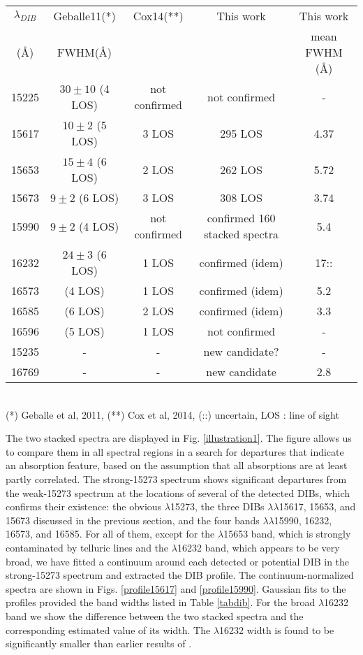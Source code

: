 \documentclass[printer]{aa} %
\begin{document}
\begin{table*}
\caption{DIB detections in the APOGEE spectral range (except
for the strong $\lambda$15273 DIB) and their widths.}             
\label{tabdib}      
\centering                         
\begin{tabular}{c c c c c}        
\hline
\hline                 
$\lambda_{DIB}$ & Geballe11(*)  &  Cox14(**)  &  This work & This work  \\    
(\AA)  & FWHM(\AA) & &  & mean FWHM (\AA) \\    
\hline                      
15225 & $ 30 \pm 10$ (4 LOS)  & not confirmed &  not confirmed & - \\
15617 & $10 \pm 2$ (5 LOS) & 3 LOS  &  295 LOS & 4.37 \\
15653 &  $ 15 \pm 4$ (6 LOS) & 2 LOS &  262 LOS & 5.72 \\
15673 & $ 9 \pm 2 $ (6 LOS) & 3 LOS  &  308 LOS &  3.74 \\
15990 & $ 9 \pm 2$ (4 LOS) & not confirmed &  confirmed 160 stacked spectra & 5.4 \\
16232 & $ 24 \pm 3 $ (6 LOS) & 1 LOS &   confirmed (idem) & 17:: \\
16573 & (4 LOS) &  1 LOS  & confirmed (idem)& 5.2\\
16585 & (6 LOS) &   2 LOS &confirmed (idem)& 3.3 \\
16596 & (5 LOS) & 1 LOS &  not confirmed  & - \\
\hline
\hline                                
15235 & - & - & new candidate? & - \\
16769 & - & - & new candidate& 2.8\\
\hline                                
\end{tabular}
\\ 
(*) Geballe et al, 2011, (**) Cox et al, 2014, (::) uncertain, LOS : line of sight
\end{table*}
The two stacked spectra are displayed in Fig. \ref{illustration1}. The figure allows us to compare them in all spectral regions in a search for departures that indicate an absorption feature, based on the assumption that all absorptions are at least partly correlated. 
The strong-15273 spectrum shows significant departures from the weak-15273 spectrum at the locations of several of the detected DIBs, which confirms their existence: the obvious $\lambda$15273, the three DIBs  $\lambda\lambda$15617, 15653, and 15673  discussed in the previous section, and the four  bands
$\lambda\lambda$15990, 16232, 16573,  and 16585. For all of them, except for the $\lambda$15653  band, which is strongly contaminated by telluric lines and the $\lambda$16232 band, which  appears to be very broad, we have fitted a continuum around each detected or potential DIB in the strong-15273 spectrum and extracted the DIB profile. The continuum-normalized spectra are shown in Figs. \ref{profile15617} and \ref{profile15990}. Gaussian fits to the profiles provided the band widths listed in Table \ref{tabdib}. For the broad $\lambda$16232 band we show the difference between the two stacked spectra and the corresponding estimated value of its width. The $\lambda$16232  width is found to be significantly smaller than earlier results of \cite{Geballe11}. \\
\end{document}
